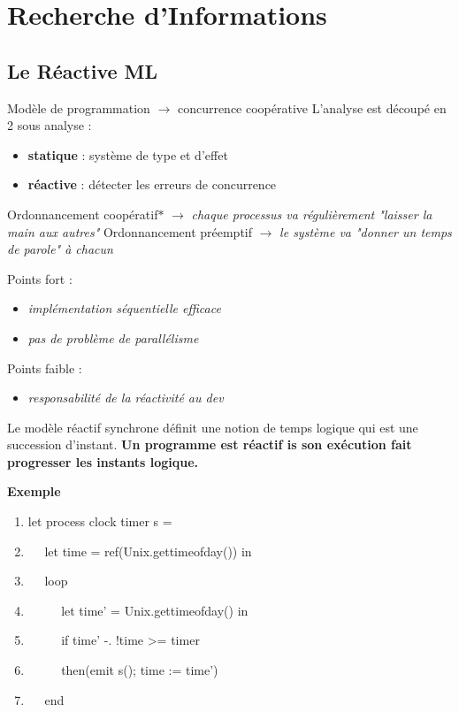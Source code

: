 \documentclass[10pt,a4paper]{article}
\begin{document}
	\section{Recherche d'Informations}\label{Recherche}
		\subsection{Le Réactive ML}
				Modèle de programmation $\longrightarrow$ concurrence coopérative 
				\smallbreak
				L'analyse est découpé en 2 sous analyse :
				\begin{itemize}
					\item \textbf{statique} : système de type et d'effet
					\item \textbf{réactive} : détecter les erreurs de concurrence
				\end{itemize}
				\bigbreak
			
			
				Ordonnancement coopératif$\ast$ $\longrightarrow$ \textit{\small{chaque processus va r\'{e}guli\`{e}rement "laisser la main aux autres"}}
				\smallbreak
				Ordonnancement pr\'{e}emptif $\longrightarrow$ \textit{\small{le syst\`{e}me va "donner un temps de parole" \`{a} chacun}}
				\medbreak
				
				Points fort :
				\begin{itemize}
					\item \textit{\small{impl\'{e}mentation s\'{e}quentielle efficace}}
					\item \textit{\small{pas de probl\`{e}me de parall\'{e}lisme}}
				\end{itemize}
				\medbreak
				
				Points faible : 
				\begin{itemize}
					\item \textit{\small{responsabilit\'{e} de la r\'{e}activit\'{e} au dev}}
				\end{itemize}
				\medbreak
				
				Le mod\`{e}le r\'{e}actif synchrone d\'{e}finit une notion de temps logique qui est une succession d'instant.
				\smallbreak
				\textbf{
					Un programme est r\'{e}actif is son ex\'{e}cution fait progresser les instants logique.
				}
				\medbreak
				
				\textbf{Exemple}
				\medbreak
				
				\begin{enumerate}
				 	\item let process clock timer s =
				 	\item $\quad$ let time = ref(Unix.gettimeofday()) in
				 	\item $\quad$ loop
				 	\item $\quad$ $\quad$ let time' = Unix.gettimeofday() in
				 	\item $\quad$ $\quad$ if time' -. !time >= timer
				 	\item $\quad$ $\quad$ then(emit s(); time := time')
				 	\item $\quad$ end 
				\end{enumerate}
				\medbreak
				
\end{document}
